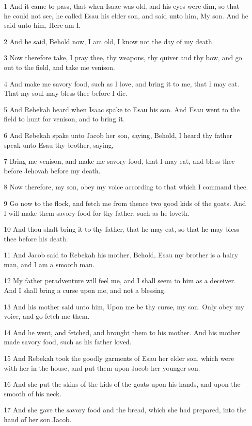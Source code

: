 \par 1 And it came to pass, that when Isaac was old, and his eyes were dim, so that he could not see, he called Esau his elder son, and said unto him, My son. And he said unto him, Here am I.
\par 2 And he said, Behold now, I am old, I know not the day of my death.
\par 3 Now therefore take, I pray thee, thy weapons, thy quiver and thy bow, and go out to the field, and take me venison.
\par 4 And make me savory food, such as I love, and bring it to me, that I may eat. That my soul may bless thee before I die.
\par 5 And Rebekah heard when Isaac spake to Esau his son. And Esau went to the field to hunt for venison, and to bring it.
\par 6 And Rebekah spake unto Jacob her son, saying, Behold, I heard thy father speak unto Esau thy brother, saying,
\par 7 Bring me venison, and make me savory food, that I may eat, and bless thee before Jehovah before my death.
\par 8 Now therefore, my son, obey my voice according to that which I command thee.
\par 9 Go now to the flock, and fetch me from thence two good kids of the goats. And I will make them savory food for thy father, such as he loveth.
\par 10 And thou shalt bring it to thy father, that he may eat, so that he may bless thee before his death.
\par 11 And Jacob said to Rebekah his mother, Behold, Esau my brother is a hairy man, and I am a smooth man.
\par 12 My father peradventure will feel me, and I shall seem to him as a deceiver. And I shall bring a curse upon me, and not a blessing.
\par 13 And his mother said unto him, Upon me be thy curse, my son. Only obey my voice, and go fetch me them.
\par 14 And he went, and fetched, and brought them to his mother. And his mother made savory food, such as his father loved.
\par 15 And Rebekah took the goodly garments of Esau her elder son, which were with her in the house, and put them upon Jacob her younger son.
\par 16 And she put the skins of the kids of the goats upon his hands, and upon the smooth of his neck.
\par 17 And she gave the savory food and the bread, which she had prepared, into the hand of her son Jacob.
